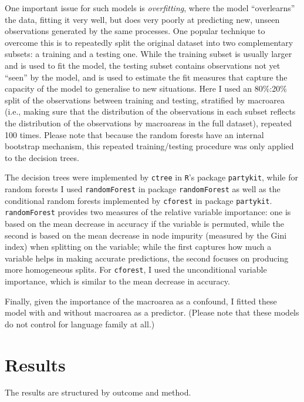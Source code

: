 \documentclass[twoside,twocolumn]{article}
\begin{document}
One important issue for such models is \emph{overfitting}, where the model ``overlearns'' the data, fitting it very well, but does very poorly at predicting new, unseen observations generated by the same processes.
One popular technique to overcome this is to repeatedly split the original dataset into two complementary subsets: a training and a testing one.
While the training subset is usually larger and is used to fit the model, the testing subset contains observations not yet ``seen'' by the model, and is used to estimate the fit measures that capture the capacity of the model to generalise to new situations.
Here I used an 80\%:20\% split of the observations between training and testing, stratified by macroarea (i.e., making sure that the distribution of the observations in each subset reflects the distribution of the observations by macroareas in the full dataset), repeated 100 times.
Please note that because the random forests have an internal bootstrap mechanism, this repeated training/testing procedure was only applied to the decision trees.

The decision trees were implemented by \texttt{ctree} in \texttt{R}'s package \texttt{partykit}, while for random forests I used \texttt{randomForest} in package \texttt{randomForest} as well as the conditional random forests implemented by \texttt{cforest} in package \texttt{partykit}.
\texttt{randomForest} provides two measures of the relative variable importance: one is based on the mean decrease in accuracy if the variable is permuted, while the second is based on the mean decrease in node impurity (measured by the Gini index) when splitting on the variable; while the first captures how much a variable helps in making accurate predictions, the second focuses on producing more homogeneous splits.
For \texttt{cforest}, I used the unconditional variable importance, which is similar to the mean decrease in accuracy.

Finally, given the importance of the macroarea as a confound, I fitted these model with and without macroarea as a predictor.
(Please note that these models do not control for language family at all.)



\section{Results}

The results are structured by outcome and method.
\end{document}
